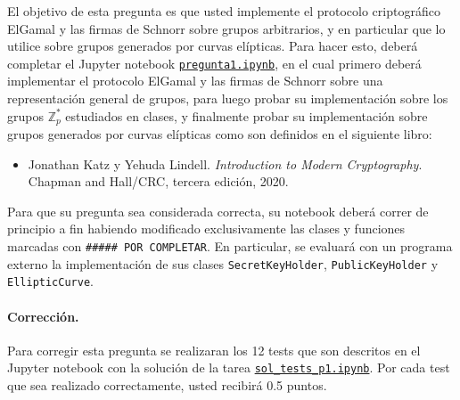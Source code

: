 

El objetivo de esta pregunta es que usted implemente el protocolo
criptográfico ElGamal y las firmas de Schnorr sobre grupos
arbitrarios, y en particular que lo utilice sobre grupos generados por
curvas elípticas. Para hacer esto, deberá completar el Jupyter
notebook
\href{https://github.com/IIC3253/2023/blob/main/tareas/tarea\%203/enunciado/questions/p1/pregunta1.ipynb}{\texttt{pregunta1.ipynb}},
en el cual primero deberá implementar el protocolo ElGamal y las
firmas de Schnorr sobre una representación general de grupos, para
luego probar su implementación sobre los grupos $\mathbb{Z}_p^*$
estudiados en clases, y finalmente probar su implementación sobre grupos
generados por curvas elípticas como son definidos en el siguiente
libro:
\begin{itemize}
  \item Jonathan Katz y Yehuda Lindell. {\em Introduction to Modern Cryptography}. Chapman and Hall/CRC, tercera edición, 2020.
\end{itemize}
Para que su pregunta sea considerada correcta, su notebook deberá
correr de principio a fin habiendo modificado exclusivamente las
clases y funciones marcadas con \texttt{\#\#\#\#\# POR COMPLETAR}. En
particular, se evaluará con un programa externo la implementación de
sus clases \texttt{SecretKeyHolder}, \texttt{PublicKeyHolder} y
\texttt{EllipticCurve}.

\medskip

\paragraph{Corrección.}
Para corregir esta pregunta se realizaran los 12 tests que son
  descritos en el Jupyter notebook con la solución de la
  tarea \href{https://github.com/IIC3253/2023/blob/main/tareas/tarea\%203/solucion/questions/p1/sol_tests_p1.ipynb}{\texttt{sol\_tests\_p1.ipynb}}. Por
  cada test que sea realizado correctamente, usted recibirá 0.5
  puntos.
